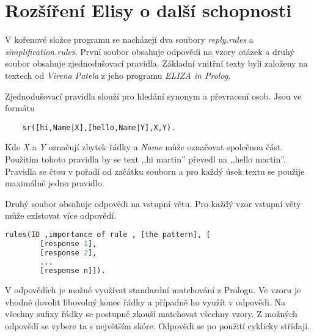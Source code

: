 \documentclass[12pt,a4paper,titlepage]{scrartcl}
\begin{document}
	\section{Rozšíření Elisy o další schopnosti}
	V kořenové složce programu se nacházejí dva soubory \textit{reply.rules} a \textit{simplification.rules}. První soubor obsahuje odpovědi na vzory otázek a druhý soubor obsahuje zjednodušovací pravidla. Základní vnitřní texty byli založeny na textech od \textit{Virena Patela} z jeho programu \textit{ELIZA in Prolog}.
	\par 
	Zjednodušovací pravidla slouží pro hledání synonym a převracení osob. Jsou ve formátu
	\begin{lstlisting}
  	sr([hi,Name|X],[hello,Name|Y],X,Y).
	\end{lstlisting}
	Kde \textit{X} a \textit{Y} označují zbytek řádky a \textit{Name} může označovat společnou část. Použitím tohoto pravidla by se text ,,hi martin'' převedl na ,,hello martin''. Pravidla se čtou v pořadí od začátku souboru a pro každý úsek textu se použije maximálně jedno pravidlo.
	\par
	Druhý soubor obsahuje odpovědi na vstupní větu. Pro každý vzor vstupní věty může existovat více odpovědí.
	\begin{lstlisting}[language=Prolog]
	rules(ID ,importance of rule , [the pattern], [
		[response 1],
		[response 2],
		...
		[response n]]).
	\end{lstlisting}
	V odpovědích je možné využívat standardní matchování z Prologu. Ve vzoru je vhodné dovolit libovolný konec řádky a případně ho využít v odpovědi. Na všechny sufixy řádky se postupně zkouší matchovat všechny vzory. Z možných odpovědí se vybere ta s největším skóre. Odpovědi se po použití cyklicky střídají.
\end{document}
